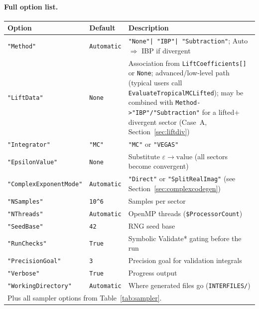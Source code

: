 \documentclass[11pt,a4paper]{article}
\begin{document}
\paragraph{Full option list.}
\begin{center}
\begin{tabular}{lll}
\toprule
\textbf{Option} & \textbf{Default} & \textbf{Description} \\
\midrule
\texttt{"Method"} & \texttt{Automatic} & \texttt{"None"|\,"IBP"|\,"Subtraction"}; Auto $\Rightarrow$ IBP if divergent \\
\texttt{"LiftData"} & \texttt{None} & Association from \texttt{LiftCoefficients[]} or \texttt{None}; advanced/low-level path (typical users call \texttt{EvaluateTropicalMCLifted}); may be combined with \texttt{Method->"IBP"/"Subtraction"} for a lifted$+$divergent sector (Case~A, Section~\ref{sec:liftdiv}) \\
\texttt{"Integrator"} & \texttt{"MC"} & \texttt{"MC"} or \texttt{"VEGAS"} \\
\texttt{"EpsilonValue"} & \texttt{None} & Substitute $\varepsilon\to\text{value}$ (all sectors become convergent) \\
\texttt{"ComplexExponentMode"} & \texttt{Automatic} & \texttt{"Direct"} or \texttt{"SplitRealImag"} (see Section~\ref{sec:complexcodegen}) \\
\texttt{"NSamples"} & \texttt{10\textasciicircum{}6} & Samples per sector \\
\texttt{"NThreads"} & \texttt{Automatic} & OpenMP threads (\texttt{\$ProcessorCount}) \\
\texttt{"SeedBase"} & \texttt{42} & RNG seed base \\
\texttt{"RunChecks"} & \texttt{True} & Symbolic Validate* gating before the run \\
\texttt{"PrecisionGoal"} & \texttt{3} & Precision goal for validation integrals \\
\texttt{"Verbose"} & \texttt{True} & Progress output \\
\texttt{"WorkingDirectory"} & \texttt{Automatic} & Where generated files go (\texttt{INTERFILES/}) \\
\multicolumn{3}{l}{Plus all sampler options from Table~\ref{tab:sampler}.} \\
\bottomrule
\end{tabular}
\end{center}
\end{document}
